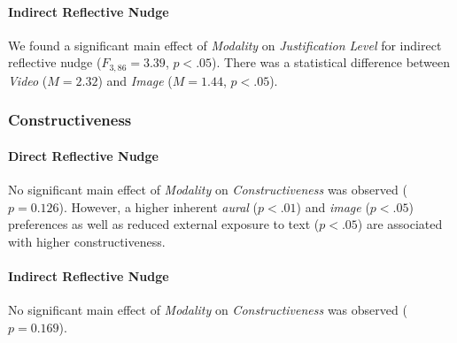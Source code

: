 \paragraph{Indirect Reflective Nudge} We found a significant main effect of \emph{Modality} on \emph{Justification Level} for indirect reflective nudge ($F_{3,86} = 3.39$, $p<.05$). There was a statistical difference between \emph{Video} ($M = 2.32$) and \emph{Image} ($M = 1.44$, $p<.05$).


\subsubsection{Constructiveness}

\paragraph{Direct Reflective Nudge} No significant main effect of \emph{Modality} on \emph{Constructiveness} was observed ($p = 0.126$). However, a higher inherent \emph{aural} ($p<.01$) and \emph{image} ($p<.05$) preferences as well as reduced external exposure to text ($p<.05$) are associated with higher constructiveness.

\paragraph{Indirect Reflective Nudge} No significant main effect of \emph{Modality} on \emph{Constructiveness} was observed ($p = 0.169$). 



